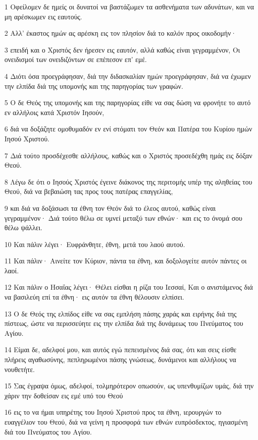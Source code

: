 \par 1 Οφείλομεν δε ημείς οι δυνατοί να βαστάζωμεν τα ασθενήματα των αδυνάτων, και να μη αρέσκωμεν εις εαυτούς.
\par 2 Αλλ' έκαστος ημών ας αρέσκη εις τον πλησίον διά το καλόν προς οικοδομήν·
\par 3 επειδή και ο Χριστός δεν ήρεσεν εις εαυτόν, αλλά καθώς είναι γεγραμμένον, Οι ονειδισμοί των ονειδιζόντων σε επέπεσον επ' εμέ.
\par 4 Διότι όσα προεγράφησαν, διά την διδασκαλίαν ημών προεγράφησαν, διά να έχωμεν την ελπίδα διά της υπομονής και της παρηγορίας των γραφών.
\par 5 Ο δε Θεός της υπομονής και της παρηγορίας είθε να σας δώση να φρονήτε το αυτό εν αλλήλοις κατά Χριστόν Ιησούν,
\par 6 διά να δοξάζητε ομοθυμαδόν εν ενί στόματι τον Θεόν και Πατέρα του Κυρίου ημών Ιησού Χριστού.
\par 7 Διά τούτο προσδέχεσθε αλλήλους, καθώς και ο Χριστός προσεδέχθη ημάς εις δόξαν Θεού.
\par 8 Λέγω δε ότι ο Ιησούς Χριστός έγεινε διάκονος της περιτομής υπέρ της αληθείας του Θεού, διά να βεβαιώση τας προς τους πατέρας επαγγελίας,
\par 9 και διά να δοξάσωσι τα έθνη τον Θεόν διά το έλεος αυτού, καθώς είναι γεγραμμένον· Διά τούτο θέλω σε υμνεί μεταξύ των εθνών· και εις το όνομά σου θέλω ψάλλει.
\par 10 Και πάλιν λέγει· Ευφράνθητε, έθνη, μετά του λαού αυτού.
\par 11 Και πάλιν· Αινείτε τον Κύριον, πάντα τα έθνη, και δοξολογείτε αυτόν πάντες οι λαοί.
\par 12 Και πάλιν ο Ησαΐας λέγει· Θέλει είσθαι η ρίζα του Ιεσσαί, Και ο ανιστάμενος διά να βασιλεύη επί τα έθνη· εις αυτόν τα έθνη θέλουσιν ελπίσει.
\par 13 Ο δε Θεός της ελπίδος είθε να σας εμπλήση πάσης χαράς και ειρήνης διά της πίστεως, ώστε να περισσεύητε εις την ελπίδα διά της δυνάμεως του Πνεύματος του Αγίου.
\par 14 Είμαι δε, αδελφοί μου, και αυτός εγώ πεπεισμένος διά σας, ότι και σεις είσθε πλήρεις αγαθωσύνης, πεπληρωμένοι πάσης γνώσεως, δυνάμενοι και αλλήλους να νουθετήτε.
\par 15 Σας έγραψα όμως, αδελφοί, τολμηρότερον οπωσούν, ως υπενθυμίζων υμάς, διά την χάριν την δοθείσαν εις εμέ υπό του Θεού
\par 16 εις το να ήμαι υπηρέτης του Ιησού Χριστού προς τα έθνη, ιερουργών το ευαγγέλιον του Θεού, διά να γείνη η προσφορά των εθνών ευπρόσδεκτος, ηγιασμένη διά του Πνεύματος του Αγίου.

